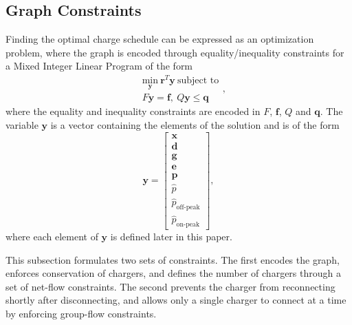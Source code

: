 \subsection{Graph Constraints}
\par Finding the optimal charge schedule can be expressed as an optimization problem, where the graph is encoded through equality/inequality constraints for a Mixed Integer Linear Program of the form 
\begin{equation}
	\begin{aligned}
		& \underset{\mathbf{y}}{\text{min}}\ \mathbf{r}^T\mathbf{y} \ \text{subject to} \\
		& F\mathbf{y} = \mathbf{f}, \ Q\mathbf{y} \le \mathbf{q}
	\end{aligned},
\end{equation}
where the equality and inequality constraints are encoded in $F$, $\mathbf{f}$, $Q$ and $\mathbf{q}$. The variable $\mathbf{y}$ is a vector containing the elements of the solution and is of the form 
\begin{equation}\label{eqn:y}
	\mathbf{y} = \begin{bmatrix}
		\mathbf{x} \\
		\mathbf{d} \\
		\mathbf{g} \\
		\mathbf{e} \\
		\mathbf{p} \\
		\hat{p} \\
		\hat{p}_\text{off-peak} \\
		\hat{p}_\text{on-peak} 
	\end{bmatrix},
\end{equation}
where each element of $\mathbf{y}$ is defined later in this paper.
\par  This subsection formulates two sets of constraints.  The first encodes the graph, enforces conservation of chargers, and defines the number of chargers through a set of net-flow constraints. The second prevents the charger from reconnecting shortly after disconnecting, and allows only a single charger to connect at a time by enforcing group-flow constraints.
